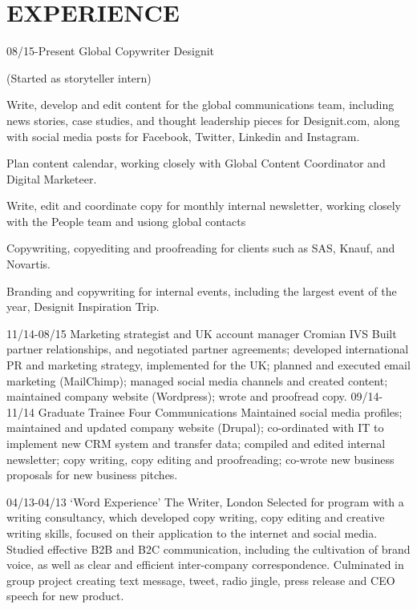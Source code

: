 \documentclass[]{friggeri-cv}
\begin{document}
\section{EXPERIENCE}

\begin{entrylist}
  \entry
  {08/15-Present}
  {Global Copywriter}
  {Designit}
  {(Started as storyteller intern)
  	
  Write, develop and edit content for the global communications team, including news stories, case studies, and thought leadership pieces for Designit.com, along with social media posts for Facebook, Twitter, Linkedin and Instagram.
  
  Plan content calendar, working closely with Global Content Coordinator and Digital Marketeer.
  
  Write, edit and coordinate copy for monthly internal newsletter, working closely with the People team and usiong global contacts
  
  Copywriting, copyediting and proofreading for clients such as SAS, Knauf, and Novartis.
  
  Branding and copywriting for internal events, including the largest event of the year, Designit Inspiration Trip.}
  \entry
  {11/14-08/15}
  {Marketing strategist and UK account manager}
  {Cromian IVS}
  {Built partner relationships, and negotiated partner agreements; developed international PR and marketing strategy, implemented for the UK; planned and executed email marketing (MailChimp); managed social media channels and created content; maintained company website (Wordpress); wrote and proofread copy.}
  \entry
  {09/14-11/14}
  {Graduate Trainee}
  {Four Communications}
  {Maintained social media profiles; maintained and updated company website (Drupal); co-ordinated with IT to implement new CRM system and transfer data; compiled and edited internal newsletter; copy writing, copy editing and proofreading; co-wrote new business proposals for new business pitches.}
\end{entrylist}
\begin{entrylist}
  \entry
  {04/13-04/13}
  {‘Word Experience’}
  {The Writer, London}
  {Selected for program with a writing consultancy, which developed copy writing, copy editing and creative writing skills, focused on their application to the internet and social media. Studied effective B2B and B2C communication, including the cultivation of brand voice, as well as clear and efficient inter-company correspondence. Culminated in group project creating text message, tweet, radio jingle, press release and CEO speech for new product.}
\end{entrylist}
\end{document}
